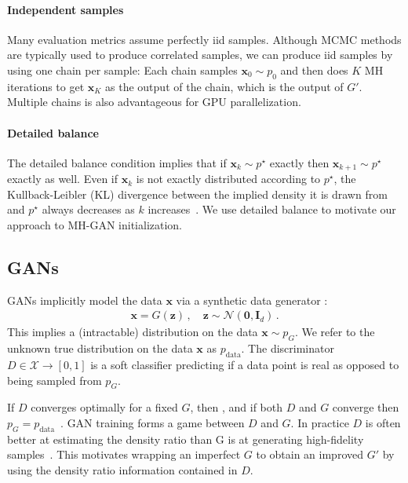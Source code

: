 \documentclass{article}
\renewcommand{\vec}[1]{{\boldsymbol{\mathbf{#1}}}} %
\newcommand{\R}{\mathbb{R}}
\newcommand{\set}[1]{\mathcal{#1}}
\newcommand{\sample}{\sim}
\newcommand{\norm}{\mathcal{N}}
\newcommand{\target}{{p^\star}}
\newcommand{\pinit}{{p_0}}
\newcommand{\PG}{{p_G}}
\newcommand{\PR}{{p_{\textrm{data}}}}
\newcommand{\setx}{\set{X}}
\begin{document}
\paragraph{Independent samples}
Many evaluation metrics assume perfectly iid samples.
Although MCMC methods are typically used to produce correlated samples, we can produce iid samples by using one chain per sample:
Each chain samples $\vec x_0 \sample \pinit$ and then does $K$ MH iterations to get $\vec x_K$ as the output of the chain, which is the output of $G'$.
Multiple chains is also advantageous for GPU parallelization.

\paragraph{Detailed balance}
The detailed balance condition implies that if $\vec x_k \sample \target$ exactly then $\vec x_{k+1} \sample \target$ exactly as well.
Even if $\vec x_k$ is not exactly distributed according to $\target$, the Kullback-Leibler (KL) divergence between the implied density it is drawn from and $\target$ always decreases as $k$ increases~\citep{Murray2008}.
We use detailed balance to motivate our approach to MH-GAN initialization.


\subsection{GANs}
\label{sec:GANs}

GANs implicitly model the data $\vec x$ via a synthetic data generator \smash{$G \in \R^{d} \rightarrow \setx$}:
\begin{align}
  \vec x = G(\vec z)\,, \quad \vec z \sample \norm(\vec 0, \vec I_{d})\,.
\end{align}
This implies a (intractable) distribution on the data $\vec x \sample \PG$.
We refer to the unknown true distribution on the data $\vec x$ as $\PR$.
The discriminator $D \in \setx \rightarrow [0,1]$ is a soft classifier predicting if a data point is real as opposed to being sampled from $\PG$\@.

If $D$ converges optimally for a fixed $G$, then \smash{$D = \PR/(\PR + \PG)$}, and if both $D$ and $G$ converge then $\PG = \PR$~\citep{Goodfellow2014}.
GAN training forms a game between $D$ and $G$.
In practice $D$ is often better at estimating the density ratio than G is at generating high-fidelity samples~\citep{Shibuya2017}.
This motivates wrapping an imperfect $G$ to obtain an improved $G'$ by using the density ratio information contained in $D$.
\end{document}
